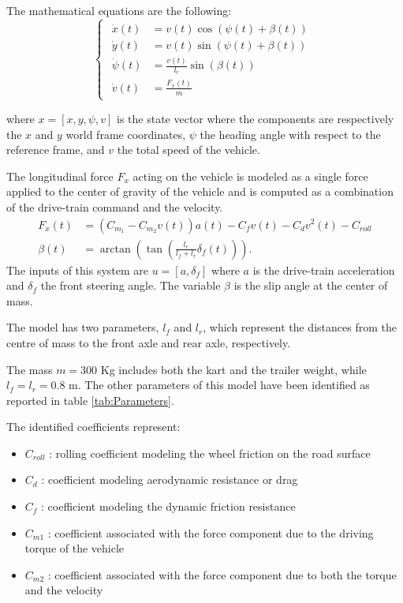 \documentclass[a4paper,12pt,oneside]{book}
\begin{document}
The mathematical equations are the following:
\begin{equation}
\begin{cases}
 	\begin{aligned}
		\dot{x}(t) &= v(t) \cos(\psi(t) + \beta(t)) \\
		\dot{y}(t) &= v(t) \sin(\psi(t) + \beta(t)) \\
		\dot{\psi}(t) &= \frac{v(t)}{l_r} \sin(\beta(t)) \\
		\dot{v}(t) &= \frac{F_x(t)}{m} 
	\end{aligned}
\end{cases}
\label{Plant}
\end{equation}

where $x = [x, y, \psi, v]$ is the state vector where the components are respectively the $x$ and $y$ world frame coordinates, $\psi$ the heading angle with respect to the reference frame, and $v$ the total speed of the vehicle.

The longitudinal force $F_x$ acting on the vehicle is modeled as a single force applied to the center of gravity of the vehicle and is computed as a combination of the drive-train command and the velocity. 
\begin{align}
    F_x (t) &= (C_{m_1} - C_{m_2} v(t)) a(t) - C_f v(t) - C_d v^2(t) - C_{roll} \label{eq:Long_force}\\
    \beta(t) &= \arctan\left(\tan\left(\frac{l_r}{l_f+l_r}\delta_f(t)\right) \right).
\end{align}
The inputs of this system are $u = [a, \delta_f]$ where $a$ is the drive-train acceleration and $\delta_f$ the front steering angle. 
The variable $\beta$ is the slip angle at the center of mass. 

\bigskip
The model has two parameters, $l_f$ and $l_r$, which represent the distances from the centre of mass to the front axle and rear axle, respectively.

The mass $m = 300$ Kg includes both the kart and the trailer weight, while $l_f = l_r = 0.8$ m.
The other parameters of this model have been identified as reported in table \ref{tab:Parameters}.


\bigskip
The identified coefficients represent:
\begin{itemize}
    \item $C_{roll}$ : rolling coefficient modeling the wheel friction on the road surface
    \item $C_d$ : coefficient modeling aerodynamic resistance or drag
    \item $C_f$ : coefficient modeling the dynamic friction resistance
    \item $C_{m1}$ : coefficient associated with the force component due to the driving torque of the vehicle
    \item $C_{m2}$ : coefficient associated with the force component due to both the torque and the velocity
\end{itemize}
\end{document}
